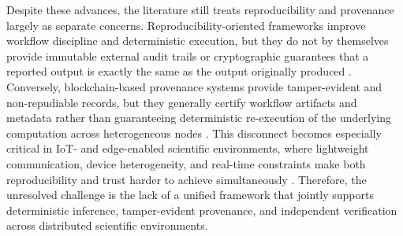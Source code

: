 \documentclass[conference]{IEEEtran}
\begin{document}
Despite these advances, the literature still treats reproducibility and provenance largely as separate concerns. Reproducibility-oriented frameworks improve workflow discipline and deterministic execution, but they do not by themselves provide immutable external audit trails or cryptographic guarantees that a reported output is exactly the same as the output originally produced \cite{wilson2017good,kanu2026protchain, heumos2023mlf}. Conversely, blockchain-based provenance systems provide tamper-evident and non-repudiable records, but they generally certify workflow artifacts and metadata rather than guaranteeing deterministic re-execution of the underlying computation across heterogeneous nodes \cite{wittek2021blockchain,al2021scichain,fernando2019sciblock}. This disconnect becomes especially critical in IoT- and edge-enabled scientific environments, where lightweight communication, device heterogeneity, and real-time constraints make both reproducibility and trust harder to achieve simultaneously \cite{standard2019mqtt,awad2023utilization}. Therefore, the unresolved challenge is the lack of a unified framework that jointly supports deterministic inference, tamper-evident provenance, and independent verification across distributed scientific environments.
\end{document}
